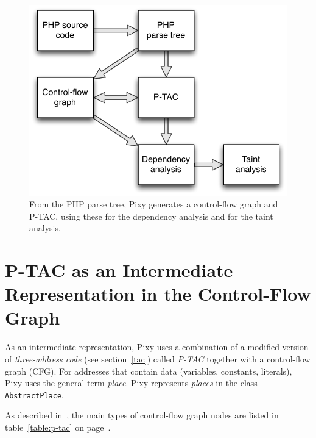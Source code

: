 \begin{figure}[htb]
 \begin{center}
   \includegraphics[scale=0.75]{images/Pixy-Arbeitsweise}
   \caption{From the PHP parse tree, Pixy generates a control-flow graph and P-TAC, using these for the dependency analysis and for the taint analysis.}
   \label{fig:pixy-data-structures}
 \end{center}
\end{figure}

\section{P-TAC as an Intermediate Representation in the Control-Flow Graph}
\label{p-tac}

As an intermediate representation, Pixy uses a combination of a modified version of \emph{three-address code} (see section~\ref{tac}) called \emph{P-TAC} together with a control-flow graph (CFG). For addresses that contain data (variables, constants, literals), Pixy uses the general term \emph{place}. Pixy represents \emph{places} in the class \texttt{AbstractPlace}.

As described in~\cite{pixy-dissertation}, the main types of control-flow graph nodes are listed in table~\ref{table:p-tac} on page~\pageref{table:p-tac}.

